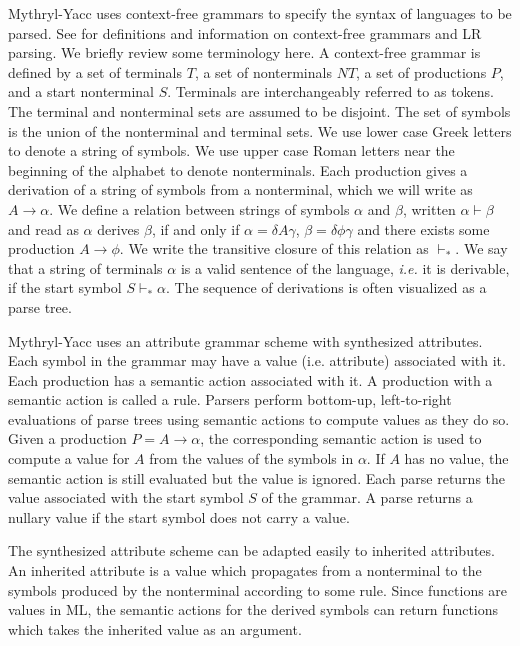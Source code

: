 Mythryl-Yacc uses context-free grammars to specify the syntax of languages to
be parsed.  See \cite{ahu} for definitions and information on context-free
grammars and LR parsing.  We briefly review some terminology here.  A
context-free grammar is defined by a set of terminals $T$, a set of
nonterminals $NT$, a set of productions $P$, and a start
nonterminal $S$.  
Terminals are interchangeably referred to as tokens.  The terminal
and nonterminal sets are assumed to be disjoint.  The set of symbols is the
union of the nonterminal and terminal sets.  We use lower case
Greek letters to denote a string of symbols.  We use upper case
Roman letters near the beginning of the alphabet to denote nonterminals.
Each production gives a
derivation of a string of symbols from a nonterminal, which we will
write as $A \rightarrow \alpha$.  We define a relation between strings of
symbols $\alpha$ and $\beta$, written $\alpha \vdash \beta$ and read
as $\alpha$ derives $\beta$, if and only if $\alpha = \delta A \gamma$,
$\beta = \delta \phi \gamma$ and 
there exists some production $A \rightarrow \phi$.  We write the
transitive closure of this relation as 
$\vdash_*$. We say that a string of terminals $\alpha$ is a valid sentence
of the language, {\em i.e.} it is derivable, if the start symbol
$S \vdash_* \alpha$.   The sequence of derivations is often
visualized as a parse tree.

Mythryl-Yacc uses an attribute grammar scheme with synthesized attributes.
Each symbol in the grammar may have a value (i.e. attribute) associated
with it.  Each production has a semantic action associated with it.
A production with a semantic action is called a rule. 
Parsers perform bottom-up, left-to-right evaluations of parse trees using semantic
actions to compute values as they do so.  Given a production
$P = A \rightarrow \alpha$, the corresponding semantic action is
used to compute a value for $A$ from the values of the symbols in $\alpha$.
If $A$ has no value, the semantic action is still evaluated but the value is ignored.
Each parse returns the value associated with the start symbol $S$ of the
grammar.  A parse returns a nullary value if the start symbol does not carry a value.

The synthesized attribute scheme can be adapted easily to inherited
attributes. An inherited attribute is a value which propagates from
a nonterminal to the symbols produced by the nonterminal according to
some rule.  Since functions are values in ML,
the semantic actions for the derived symbols
can return functions which takes the
inherited value as an argument.

